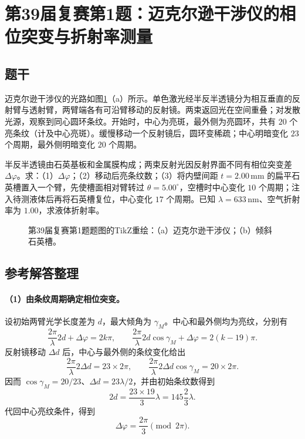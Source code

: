 \section{第39届复赛第1题：迈克尔逊干涉仪的相位突变与折射率测量}

\subsection{题干}
迈克尔逊干涉仪的光路如图\ref{fig:cpho39q01}（a）所示。单色激光经半反半透镜分为相互垂直的反射臂与透射臂，两臂端各有可沿臂移动的反射镜。两束返回光在空间重叠；对发散光源，观察到同心圆环条纹。开始时，中心为亮斑，最外侧为亮圆环，共有 $20$ 个亮条纹（计及中心亮斑）。缓慢移动一个反射镜后，圆环变稀疏；中心明暗变化 $23$ 个周期，最外侧明暗变化 $20$ 个周期。

半反半透镜由石英基板和金属膜构成；两束反射光因反射界面不同有相位突变差 $\Delta\varphi$。求：（1）$\Delta\varphi$；（2）移动后亮条纹数；（3）将内壁间距 $t=2.00\,\mathrm{mm}$ 的扁平石英槽置入一个臂，先使槽面相对臂转过 $\theta=5.00^\circ$，空槽时中心变化 $10$ 个周期；注入待测液体后再将石英槽复位，中心变化 $17$ 个周期。已知 $\lambda=633\,\mathrm{nm}$、空气折射率为 $1.00$，求液体折射率。

\begin{figure}[htbp]
  \centering
  
  \caption{第39届复赛第1题题图的TikZ重绘：（a）迈克尔逊干涉仪；（b）倾斜石英槽。}
  \label{fig:cpho39q01}
\end{figure}

\subsection{参考解答整理}
\paragraph{（1）由条纹周期确定相位突变。}
设初始两臂光学长度差为 $d$，最大倾角为 $\gamma_M$。中心和最外侧均为亮纹，分别有
\[
\frac{2\pi}{\lambda}2d+\Delta\varphi=2k\pi,\qquad
\frac{2\pi}{\lambda}2d\cos\gamma_M+\Delta\varphi=2(k-19)\pi.
\]
反射镜移动 $\Delta d$ 后，中心与最外侧的条纹变化给出
\[
\frac{2\pi}{\lambda}2\Delta d=23\times2\pi,\qquad
\frac{2\pi}{\lambda}2\Delta d\cos\gamma_M=20\times2\pi.
\]
因而 $\cos\gamma_M=20/23$、$\Delta d=23\lambda/2$，并由初始条纹数得到
\[
2d=\frac{23\times19}{3}\lambda=145\frac23\lambda.
\]
代回中心亮纹条件，得到
\[
\boxed{\Delta\varphi=\frac{2\pi}{3}\pmod{2\pi}.}
\]

